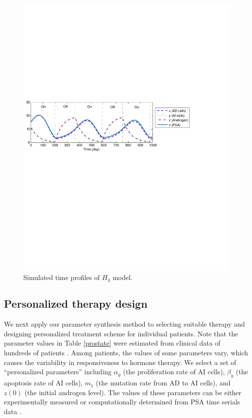 \begin{figure}[htb]
\centering
\includegraphics[scale=0.5]{fig-prostatetraj}
\caption{Simulated time profiles of $H_3$ model.}
\label{prostate-fig1}
\end{figure}

\subsection{Personalized therapy design}
We next apply our parameter synthesis method to selecting suitable therapy and designing personalized treatment scheme for individual patients. Note that the parameter values in Table \ref{prostate} were estimated from clinical data of hundreds of patients \citep{bruchovsky07}. Among patients, the values of some parameters vary, which causes the variability in responsiveness to hormone therapy. We select a set of ``personalized parameters'' including $\alpha_y$ (the proliferation rate of AI cells), $\beta_y$ (the apoptosis rate of AI cells), $m_1$ (the mutation rate from AD to AI cells), and $z(0)$ (the initial androgen level). The values of these parameters can be either experimentally measured \citep{berges95} or computationally determined from PSA time serials data \citep{hirata10}.

